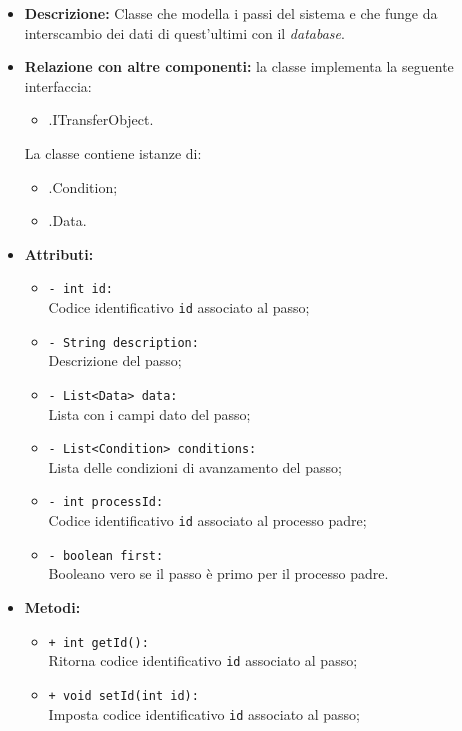 \begin{flushleft}
\begin{itemize}
\item \textbf{Descrizione:} Classe che modella i passi del sistema e che funge da interscambio dei dati di quest'ultimi con il \textit{database}.
\item \textbf{Relazione con altre componenti:} la classe implementa la seguente interfaccia:
		\begin{itemize}
			\item \smodel{}.ITransferObject.
		\end{itemize}
		La classe contiene istanze di:
		\begin{itemize}
			\item \smodel{}.Condition;
			\item \smodel{}.Data.
		\end{itemize}
\item \textbf{Attributi:}
\begin{sloppypar}
\begin{itemize}
\item \texttt{- int id:}\\ Codice identificativo \texttt{id} associato al passo;
\item \texttt{- String description:}\\ Descrizione del passo;
\item \texttt{- List<Data> data:}\\ Lista con i campi dato del passo;
\item \texttt{- List<Condition> conditions:}\\ Lista delle condizioni di avanzamento del passo;
\item \texttt{- int processId:}\\ Codice identificativo \texttt{id} associato al processo padre;
\item \texttt{- boolean first:}\\ Booleano vero se il passo è primo per il processo padre.
\end{itemize}
\end{sloppypar}
\item \textbf{Metodi:}
\begin{sloppypar}
\begin{itemize}
\item \texttt{+ int getId():}\\ Ritorna codice identificativo \texttt{id} associato al passo;
\item \texttt{+ void setId(int id):}\\ Imposta codice identificativo \texttt{id} associato al passo;

\end{itemize}
\end{sloppypar}
\end{itemize}
\end{flushleft}
